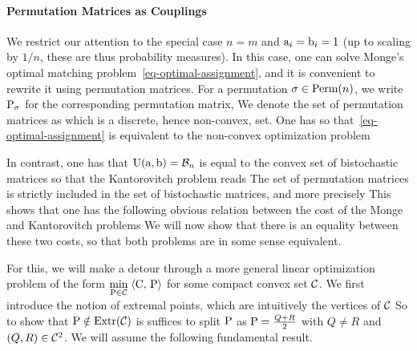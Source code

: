 \paragraph{Permutation Matrices as Couplings} 

We restrict our attention to the special case $n=m$ and $\a_i=\b_i=1$ (up to scaling by $1/n$, these are thus probability measures).
%
In this case, one can solve Monge's optimal matching problem~\eqref{eq-optimal-assignment}, and it is convenient to rewrite it using permutation matrices. 
%
For a permutation $\si\in\Perm(n)$, we write $\P_{\si}$ for the corresponding permutation matrix,
We denote the set of permutation matrices as
which is a discrete, hence non-convex, set. One has
so that~\eqref{eq-optimal-assignment} is equivalent to the non-convex optimization problem

In contrast, one has that $\CouplingsD(\a,\b) = \Bb_n$ is equal to the convex set of bistochastic matrices 
so that the Kantorovitch problem reads 
The set of permutation matrices is strictly included in the set of bistochastic matrices, and more precisely
This shows that one has the following obvious relation between the cost of the Monge and Kantorovitch problems
We will now show that there is an equality between these two costs, so that both problems are in some sense equivalent. 


For this, we will make a detour through a more general linear optimization problem of the form $\umin{\P \in \Cc} \dotp{\C}{\P}$ for some compact convex set $\Cc$. We first introduce the notion of extremal points, which are intuitively the vertices of $\Cc$
So to show that $\P \notin \text{Extr}(\Cc)$ is suffices to split $\P$ as $\P = \frac{Q+R}{2}$ with $Q \neq R$ and $(Q,R) \in \Cc^2$.
%
We will assume the following fundamental result.

